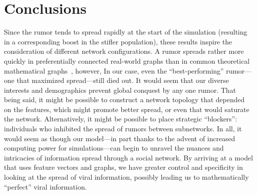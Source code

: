 \section{Conclusions}
\label{sec:conclusions}
Since the rumor tends to spread rapidly at the start of the simulation (resulting in a corresponding boost in the stifler population), these results inspire the consideration of different network configurations.
A rumor spreads rather more quickly in preferentially connected real-world graphs than in common theoretical mathematical graphs~\cite{doerr-2012}, however, In our case, even the ``best-performing'' rumor---one that maximized spread---still died out.
It would seem that our diverse interests and demographics prevent global conquest by any one rumor.
That being said, it might be possible to construct a network topology that depended on the features, which might promote better spread, or even that would saturate the network.
Alternatively, it might be possible to place strategic ``blockers'': individuals who inhibited the spread of rumors between subnetworks.
In all, it would seem as though our model---in part thanks to the advent of increased computing power for simulations---can begin to unravel the nuances and intricacies of information spread through a social network.
By arriving at a model that uses feature vectors and graphs, we have greater control and specificity in looking at the spread of viral information, possibly leading us to mathematically ``perfect'' viral information.
